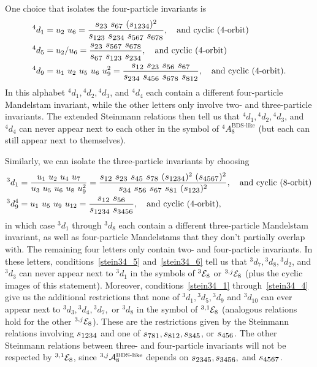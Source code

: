 \documentclass[11pt]{article}
\def\mand#1{\scaleto{s}{4.6pt}_{\scaleto{#1}{5.2pt}}}
\begin{document}
One choice that isolates the four-particle invariants is
\begin{align}
{}^4 d_1 &= u_2 \ u_6 = \frac{\mand{23} \ \mand{67} \ (\mand{1234})^2}{\mand{123} \ \mand{234} \ \mand{567} \ \mand{678}}, \quad \text{and cyclic (4-orbit)} \\
{}^4 d_5 &= u_2/u_6 = \frac{\mand{23} \ \mand{567} \ \mand{678}}{\mand{67} \ \mand{123} \ \mand{234}}, \quad \text{and cyclic (4-orbit)} \\
{}^4 d_9 &= u_1 \ u_2 \ u_5 \ u_6 \ u_9^2 = \frac{\mand{12} \ \mand{23} \ \mand{56} \ \mand{67}}{\mand{234} \ \mand{456} \ \mand{678} \ \mand{812}}, \quad \text{and cyclic (4-orbit)}.
\end{align}
In this alphabet ${}^4 d_1, {}^4 d_2, {}^4 d_3$, and ${}^4 d_4$ each contain a different four-particle Mandelstam invariant, while the other letters only involve two- and three-particle invariants. The extended Steinmann relations then tell us that ${}^4 d_1, {}^4 d_2, {}^4 d_3$, and ${}^4 d_4$ can never appear next to each other in the symbol of ${}^4 A^{\text{BDS-like}}_{8}$ (but each can still appear next to themselves).

Similarly, we can isolate the three-particle invariants by choosing
\begin{align}
{}^3 d_1 &= \frac{u_1 \ u_2 \ u_4 \ u_7}{u_3 \ u_5 \ u_6 \ u_8 \ u_9^2} = \frac{\mand{12} \ \mand{23} \ \mand{45} \ \mand{78} \ (\mand{1234})^2 \ (\mand{4567})^2}{\mand{34} \ \mand{56} \ \mand{67} \ \mand{81} \ (\mand{123})^2}, \quad \text{and cyclic (8-orbit)} \\
{}^3 d^4_9 &= u_1 \ u_5 \ u_9 \ u_{12} = \frac{\mand{12} \ \mand{56}}{\mand{1234} \ \mand{3456}}, \quad \text{and cyclic (4-orbit)},
\end{align}
in which case ${}^3 d_1$ through ${}^3 d_8$ each contain a different three-particle Mandelstam invariant, as well as four-particle Mandelstams that they don't partially overlap with. The remaining four letters only contain two- and four-particle invariants. In these letters, conditions~\eqref{stein34_5} and~\eqref{stein34_6} tell us that ${}^3 d_7, {}^3 d_8, {}^3 d_2$, and ${}^3 d_3$ can never appear next to ${}^3 d_1$ in the symbols of ${}^{3} {\cal E}_8$ or ${}^{3,j} {\cal E}_8$ (plus the cyclic images of this statement). Moreover, conditions~\eqref{stein34_1} through~\eqref{stein34_4} give us the additional restrictions that none of ${}^3 d_1, {}^3 d_5, {}^3 d_9$ and ${}^3 d_{10}$ can ever appear next to ${}^3 d_3, {}^3 d_4, {}^3 d_7,$ or ${}^3 d_8$ in the symbol of ${}^{3,1} {\cal E}_8$ (analogous relations hold for the other ${}^{3,j} {\cal E}_8$). These are the restrictions given by the Steinmann relations involving $\mand{1234}$ and one of $\mand{781}, \mand{812}, \mand{345}$, or $\mand{456}$. The other Steinmann relations between three- and four-particle invariants will not be respected by ${}^{3,1} {\cal E}_8$, since ${}^{3,j} {\cal A}^{\text{BDS-like}}_{8}$ depends on $\mand{2345}, \mand{3456},$ and $\mand{4567}$.




\end{document}
